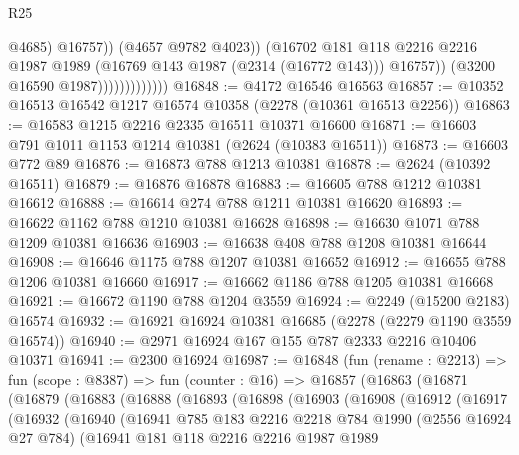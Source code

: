 \begin{lexlean}{R25}
\begin{coremodule}
                                      @4685)
                                    @16757))
                                (@4657 @9782 @4023))
                              (@16702
                                @181
                                @118
                                @2216
                                @2216
                                @1987
                                @1989
                                (@16769 @143 @1987 (@2314 (@16772 @143)))
                                @16757))
                            (@3200 @16590 @1987)))))))))))))
@16848 := @4172 @16546 @16563
@16857 := @10352 @16513 @16542 @1217 @16574 @10358 (@2278 (@10361 @16513 @2256))
@16863 := @16583 @1215 @2216 @2335 @16511 @10371 @16600
@16871 := @16603 @791 @1011 @1153 @1214 @10381 (@2624 (@10383 @16511))
@16873 := @16603 @772 @89
@16876 := @16873 @788 @1213 @10381
@16878 := @2624 (@10392 @16511)
@16879 := @16876 @16878
@16883 := @16605 @788 @1212 @10381 @16612
@16888 := @16614 @274 @788 @1211 @10381 @16620
@16893 := @16622 @1162 @788 @1210 @10381 @16628
@16898 := @16630 @1071 @788 @1209 @10381 @16636
@16903 := @16638 @408 @788 @1208 @10381 @16644
@16908 := @16646 @1175 @788 @1207 @10381 @16652
@16912 := @16655 @788 @1206 @10381 @16660
@16917 := @16662 @1186 @788 @1205 @10381 @16668
@16921 := @16672 @1190 @788 @1204 @3559
@16924 := @2249 (@15200 @2183) @16574
@16932 := @16921 @16924 @10381 @16685 (@2278 (@2279 @1190 @3559 @16574))
@16940 := @2971 @16924 @167 @155 @787 @2333 @2216 @10406 @10371
@16941 := @2300 @16924
@16987 := @16848
    (fun (rename : @2213) =>
    fun (scope : @8387) =>
    fun (counter : @16) =>
    @16857
      (@16863
        (@16871
          (@16879
            (@16883
              (@16888
                (@16893
                  (@16898
                    (@16903
                      (@16908
                        (@16912
                          (@16917
                            (@16932
                              (@16940
                                (@16941
                                  @785
                                  @183
                                  @2216
                                  @2218
                                  @784
                                  @1990
                                  (@2556 @16924 @27 @784)
                                  (@16941
                                    @181
                                    @118
                                    @2216
                                    @2216
                                    @1987
                                    @1989

\end{coremodule}
\end{lexlean}
